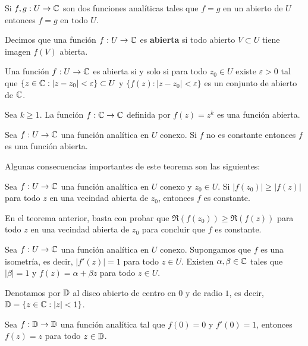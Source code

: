 \begin{theorem}
  Si $f, g: U \to \mathbb C$ son dos funciones anal\'iticas tales que $f = g$ en un abierto de $U$
  entonces $f = g$ en todo $U$.
\end{theorem}

Decimos que una funci\'on $f: U \to \mathbb C$ es \textbf{abierta} si todo abierto $V \subset U$ tiene imagen
$f(V)$ abierta.

\begin{theorem}
  Una funci\'on $f: U \to \mathbb C$ es abierta si y solo si para todo $z_0 \in U$ existe
  $\varepsilon > 0$ tal que $\{z \in \mathbb C: |z - z_0| < \varepsilon\} \subset U$ y
  $\{f(z): |z - z_0| < \varepsilon\}$ es un conjunto de abierto de $\mathbb C$.
\end{theorem}

\begin{example}
  Sea $k \geq 1$. La funci\'on $f: \mathbb C \to \mathbb C$ definida por $f(z) = z^k$ es una funci\'on abierta.
\end{example}

\begin{theorem}
  Sea $f: U \to \mathbb C$ una funci\'on anal\'itica en $U$ conexo.
  Si $f$ no es constante entonces $f$ es una funci\'on abierta.
\end{theorem}

Algunas consecuencias importantes de este teorema son las siguientes:

\begin{theorem}
  Sea $f: U \to \mathbb C$ una funci\'on anal\'itica en $U$ conexo y $z_0 \in U$.
  Si $|f(z_0)| \geq |f(z)|$ para todo $z$ en una vecindad abierta de $z_0$,
  entonces $f$ es constante.
\end{theorem}

\begin{remark}
  En el teorema anterior, basta con probar que $\Re(f(z_0)) \geq \Re(f(z))$ para todo $z$ en
  una vecindad abierta de $z_0$ para concluir que $f$ es constante.
\end{remark}

\begin{theorem}
  Sea $f: U \to \mathbb C$ una funci\'on anal\'itica en $U$ conexo. Supongamos que $f$ es una
  isometr\'ia, es decir, $|f'(z)| = 1$ para todo $z \in U$. Existen $\alpha, \beta \in \mathbb C$ tales que
  $|\beta| = 1$ y $f(z) = \alpha + \beta z$ para todo $z \in U$.
\end{theorem}

Denotamos por $\mathbb{D}$ al disco abierto de centro en $0$ y de radio $1$, es decir,
$\mathbb{D} = \{z \in \mathbb C: |z| < 1\}$.

\begin{example}
  Sea $f: \mathbb{D} \to \mathbb{D}$ una funci\'on anal\'itica tal que $f(0) = 0$ y $f'(0) = 1$, entonces
  $f(z) =  z$ para todo $z \in \mathbb{D}$.
\end{example}